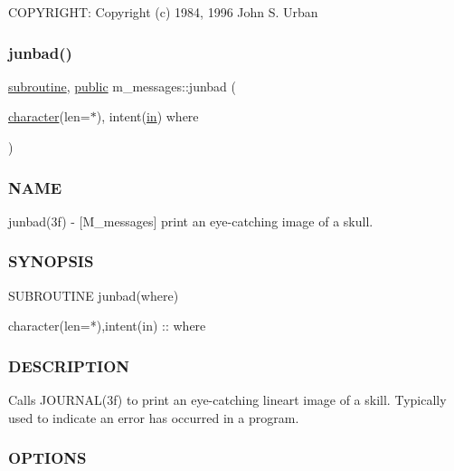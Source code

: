 C\+O\+P\+Y\+R\+I\+G\+HT\+: Copyright (c) 1984, 1996 John S. Urban \mbox{\label{namespacem__messages_acad2630aef5050e3cfda550f22141f3c}} 
\subsubsection{\texorpdfstring{junbad()}{junbad()}}
{\footnotesize\ttfamily \hyperlink{M__stopwatch_83_8txt_acfbcff50169d691ff02d4a123ed70482}{subroutine}, \hyperlink{M__stopwatch_83_8txt_a2f74811300c361e53b430611a7d1769f}{public} m\+\_\+messages\+::junbad (\begin{DoxyParamCaption}\item[{\hyperlink{option__stopwatch_83_8txt_abd4b21fbbd175834027b5224bfe97e66}{character}(len=$\ast$), intent(\hyperlink{M__journal_83_8txt_afce72651d1eed785a2132bee863b2f38}{in})}]{where }\end{DoxyParamCaption})}



\subsubsection*{N\+A\+ME}

junbad(3f) -\/ \mbox{[}M\+\_\+messages\mbox{]} print an eye-\/catching image of a skull. 

\subsubsection*{S\+Y\+N\+O\+P\+S\+IS}

\begin{DoxyVerb}SUBROUTINE junbad(where)

 character(len=*),intent(in) :: where
\end{DoxyVerb}


\subsubsection*{D\+E\+S\+C\+R\+I\+P\+T\+I\+ON}

\begin{DoxyVerb}Calls JOURNAL(3f) to print an eye-catching lineart image of a skill.
Typically used to indicate an error has occurred in a program.
\end{DoxyVerb}


\subsubsection*{O\+P\+T\+I\+O\+NS}

